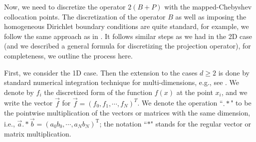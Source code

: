 \documentclass[12pt,letterpaper]{amsart}
\theoremstyle{remark}
\numberwithin{equation}{section}
\numberwithin{theorem}{section}
\numberwithin{table}{section}
\begin{document}
Now, we need to discretize the operator $2(B+P)$ with the mapped-Chebyshev collocation points.
The discretization of the operator $B$ as well as imposing the homogeneous Dirichlet boundary conditions are quite standard, for example, we follow the same approach as in \cite[Chapters 6, 9, 12]{T2001}. It follows similar steps as we had in the 2D case \cite{FHRY} (and we described  a general formula for discretizing the projection operator), for completeness, we outline the process here. 

First, we consider the 1D case. Then the extension to the cases $d\geq 2$ is done by standard numerical integration technique for multi-dimensions, e.g., see \cite[Chapters 6, 12]{T2001}.
We denote by $f_i$ %
the discretized form of the function $f(x)$ at the point $x_i$, and we write the vector $\vec{f}$ for $\vec{f}=(f_0,f_1,\cdots,f_N)^T$. We denote the operation ``$.*$" to be the pointwise multiplication of the vectors or matrices with the same dimension, i.e., $\vec{a}.*\vec{b}=(a_0b_0,\cdots,a_Nb_N)^{\mathrm{T}}$; the notation ``$*$" stands for the regular vector or matrix multiplication.
\end{document}

